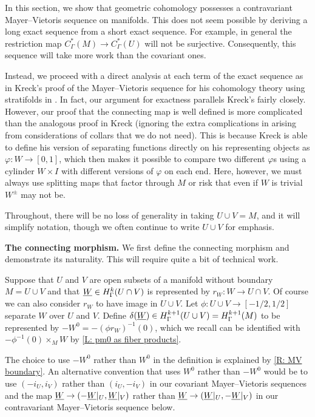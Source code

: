 In this section, we show that geometric cohomology possesses a contravariant Mayer--Vietoris sequence on manifolds.
This does not seem possible by deriving a long exact sequence from a short exact sequence.
For example, in general the restriction map $C^*_\Gamma(M) \to C^*_\Gamma(U)$ will not be surjective.
Consequently, this sequence will take more work than the covariant ones.

Instead, we proceed with a direct analysis at each term of the exact sequence as in Kreck's proof of the Mayer--Vietoris sequence for his cohomology theory using stratifolds in \cite{Krec10}.
In fact, our argument for exactness parallels Kreck's fairly closely.
However, our proof that the connecting map is well defined is more complicated than the analogous proof in Kreck (ignoring the extra complications in \cite{Krec10} arising from considerations of collars that we do not need).
This is because Kreck is able to define his version of separating functions directly on his representing objects as $\varphi \colon W \to [0,1]$, which then makes it possible to compare two different $\varphi$s using a cylinder $W \times I$ with different versions of $\varphi$ on each end.
Here, however, we must always use splitting maps that factor through $M$ or risk that even if $W$ is trivial $W^{\pm}$ may not be.

Throughout, there will be no loss of generality in taking $U \cup V = M$, and it will simplify notation, though we often continue to write $U \cup V$ for emphasis.

\medskip
\noindent\textbf{The connecting morphism.} We first define the connecting morphism and demonstrate its naturality.
This will require quite a bit of technical work.

\begin{definition}\label{D: connecting}
	Suppose that $U$ and $V$ are open subsets of a manifold without boundary $M = U \cup V$ and that $\underline{W} \in H^k_\Gamma(U \cap V)$ is represented by $r_W \colon W \to U \cap V$.
	Of course we can also consider $r_W$ to have image in $U \cup V$.
	Let $\phi \colon U \cup V \to [-1/2,1/2]$ separate $W$ over $U$ and $V$.
	Define $\delta(\underline{W}) \in H^{k+1}_\Gamma(U \cup V) = H^{k+1}_\Gamma(M)$ to be represented by $-W^0 = -(\phi r_W)^{-1}(0)$, which we recall can be identified with $-\phi^{-1}(0)\times_M W$ by \cref{L: pm0 as fiber products}.
\end{definition}

The choice to use $-W^0$ rather than $W^0$ in the definition is explained by \cref{R: MV boundary}.
An alternative convention that uses $W^0$ rather than $-W^0$ would be to use $(-i_U,i_V)$ rather than $(i_U,-i_V)$ in our covariant Mayer--Vietoris sequences and the map $\underline{W} \to (-\underline{W}|_U, \underline{W}|_V)$ rather than $\underline{W} \to (\underline{W}|_U, -\underline{W}|_V)$ in our contravariant Mayer--Vietoris sequence below.

